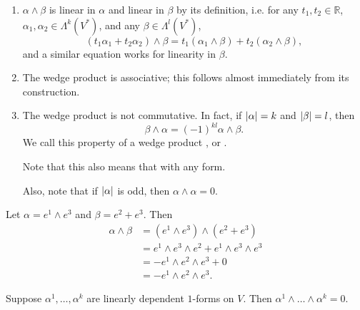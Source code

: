 \documentclass[notoc,notitlepage]{tufte-book}
\begin{document}
\begin{remark}\label{remark:wedge_product_operation_properties}
  \begin{enumerate}
    \item $\alpha \wedge \beta$ is linear in $\alpha$ and linear in $\beta$ by its
      definition, i.e. for any $t_1, t_2 \in \mathbb{R}$,
      $\alpha_1, \alpha_2 \in \Lambda^k(V^*)$, and any $\beta \in \Lambda^l(V^*)$,
      \begin{equation*}
        (t_1 \alpha_1 + t_2 \alpha_2) \wedge \beta
        = t_1(\alpha_1 \wedge \beta) + t_2(\alpha_2 \wedge \beta),
      \end{equation*}
      and a similar equation works for linearity in $\beta$.
    \item The wedge product is associative; this follows almost immediately from
      its construction.
    \item The wedge product is not commutative. In fact, if $\left|\alpha\right| = k$ and
      $\left|\beta\right| = l$, then
      \begin{equation}\label{eq:wedge_product_is_not_commutative}
        \beta \wedge \alpha = \left( -1 \right)^{kl} \alpha \wedge \beta.
      \end{equation}
      We call this property of a wedge product ,
       or .

      Note that this also means that  with any
      form.

      Also, note that if $\left|\alpha\right|$ is odd, then $\alpha \wedge \alpha = 0$.
  \end{enumerate}
\end{remark}

\begin{eg}
  Let $\alpha = e^1 \wedge e^3$ and $\beta = e^2 + e^3$. Then
  \begin{align*}
    \alpha \wedge \beta &= \left( e^1 \wedge e^3 \right) \wedge \left( e^2 + e^3 \right) \\
                        &= e^1 \wedge e^3 \wedge e^2 + e^1 \wedge e^3 \wedge e^3 \\
                        &= - e^1 \wedge e^2 \wedge e^3 + 0 \\
                        &= - e^1 \wedge e^2 \wedge e^3.
  \end{align*}
\end{eg}

\begin{crly}\label{crly:linearly_dependent_1_forms}
  Suppose $\alpha^1, \ldots, \alpha^k$ are linearly dependent $1$-forms on $V$.
  Then $\alpha^1 \wedge \hdots \wedge \alpha^k = 0$.
\end{crly}
\end{document}
